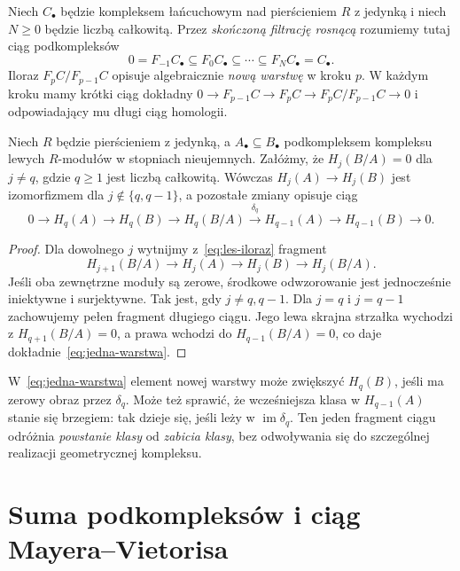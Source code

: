\begin{definicja}
\label{def:filtracja-kompleksu}
Niech $C_\bullet$ będzie kompleksem łańcuchowym
nad pierścieniem $R$ z jedynką i niech $N\geq0$ będzie
liczbą całkowitą. Przez \emph{skończoną filtrację rosnącą}
rozumiemy tutaj ciąg podkompleksów
\[
 0=F_{-1}C_\bullet\subseteq
 F_0C_\bullet\subseteq\cdots\subseteq
 F_NC_\bullet=C_\bullet.
\]
Iloraz $F_pC/F_{p-1}C$ opisuje
algebraicznie \emph{nową warstwę}
w kroku $p$. W każdym kroku mamy
krótki ciąg dokładny
$0\to F_{p-1}C\to F_pC\to
F_pC/F_{p-1}C\to0$
i odpowiadający mu długi ciąg homologii.
\end{definicja}

\begin{wniosek}
\label{wn:filtracja-jeden-stopien}
Niech $R$ będzie pierścieniem z jedynką,
a $A_\bullet\subseteq B_\bullet$ podkompleksem
kompleksu lewych $R$-modułów w stopniach
nieujemnych. Załóżmy, że
$H_j(B/A)=0$ dla $j\ne q$, gdzie $q\geq1$
jest liczbą całkowitą.
Wówczas $H_j(A)\to H_j(B)$ jest
izomorfizmem dla $j\notin\{q,q-1\}$,
a pozostałe zmiany opisuje ciąg
\begin{equation}\label{eq:jedna-warstwa}
 0\to H_q(A)\to H_q(B)\to H_q(B/A)
 \xrightarrow{\delta_q}H_{q-1}(A)
 \to H_{q-1}(B)\to0.
\end{equation}
\end{wniosek}
\begin{proof}
Dla dowolnego $j$ wytnijmy z~\eqref{eq:les-iloraz}
fragment
\[
 H_{j+1}(B/A)\to H_j(A)\to H_j(B)\to H_j(B/A).
\]
Jeśli oba zewnętrzne moduły są zerowe,
środkowe odwzorowanie jest jednocześnie
iniektywne i surjektywne.
Tak jest, gdy $j\ne q,q-1$.
Dla $j=q$ i $j=q-1$ zachowujemy
pełen fragment długiego ciągu.
Jego lewa skrajna strzałka wychodzi
z $H_{q+1}(B/A)=0$, a prawa
wchodzi do $H_{q-1}(B/A)=0$,
co daje dokładnie~\eqref{eq:jedna-warstwa}.
\end{proof}

\begin{uwaga}
W~\eqref{eq:jedna-warstwa} element
nowej warstwy może zwiększyć
$H_q(B)$, jeśli ma zerowy obraz
przez $\delta_q$. Może też sprawić,
że wcześniejsza klasa w
$H_{q-1}(A)$ stanie się brzegiem:
tak dzieje się, jeśli leży w
$\operatorname{im}\delta_q$.
Ten jeden fragment ciągu odróżnia
\emph{powstanie klasy} od
\emph{zabicia klasy}, bez odwoływania
się do szczególnej realizacji
geometrycznej kompleksu.
\end{uwaga}
\section{Suma podkompleksów i ciąg Mayera--Vietorisa}
\label{sec:mv-algebraiczny}

